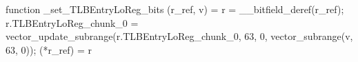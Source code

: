 function _set_TLBEntryLoReg_bits (r_ref, v) = {
    r = __bitfield_deref(r_ref);
    r.TLBEntryLoReg_chunk_0 = vector_update_subrange(r.TLBEntryLoReg_chunk_0, 63, 0, vector_subrange(v, 63, 0));
    (*r_ref) = r
}
